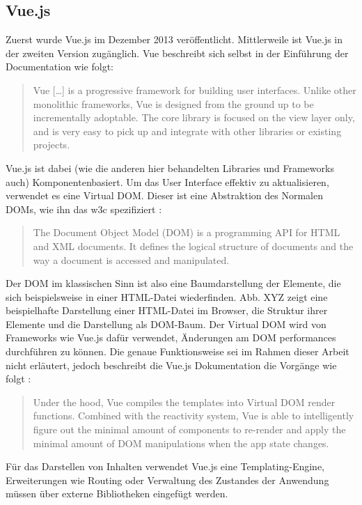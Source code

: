 \subsection{Vue.js}
Zuerst wurde Vue.js im Dezember 2013 veröffentlicht. Mittlerweile ist Vue.js in der zweiten Version zugänglich.
Vue beschreibt sich selbst in der Einführung der Documentation wie folgt:

\begin{quote}
  Vue […] is a progressive framework for building user interfaces. Unlike other monolithic frameworks, Vue is designed from the ground up to be incrementally adoptable. The core library is focused on the view layer only, and is very easy to pick up and integrate with other libraries or existing projects. \cite{VueIntro}
\end{quote}

Vue.js ist dabei (wie die anderen hier behandelten Libraries und Frameworks auch) Komponentenbasiert. Um das User Interface effektiv zu aktualisieren, verwendet es eine Virtual DOM. Dieser ist eine Abstraktion des Normalen DOMs, wie ihn das w3c spezifiziert \cite{w3cDOM}:

\begin{quote}
  The Document Object Model (DOM) is a programming API for HTML and XML documents. It defines the logical structure of documents and the way a document is accessed and manipulated.
\end{quote}

Der DOM im klassischen Sinn ist also eine Baumdarstellung der Elemente, die sich beispielsweise in einer HTML-Datei wiederfinden. Abb. XYZ zeigt eine beispielhafte Darstellung einer HTML-Datei im Browser, die Struktur ihrer Elemente und die Darstellung als DOM-Baum.
Der Virtual DOM wird von Frameworks wie Vue.js dafür verwendet, Änderungen am DOM performances durchführen zu können. Die genaue Funktionsweise sei im Rahmen dieser Arbeit nicht erläutert,  jedoch beschreibt die Vue.js Dokumentation die Vorgänge wie folgt \cite{VueTemplate}:

\begin{quote}
  Under the hood, Vue compiles the templates into Virtual DOM render functions. Combined with the reactivity system, Vue is able to intelligently figure out the minimal amount of components to re-render and apply the minimal amount of DOM manipulations when the app state changes.
\end{quote}

Für das Darstellen von Inhalten verwendet Vue.js eine Templating-Engine, Erweiterungen wie Routing oder Verwaltung des Zustandes der Anwendung müssen über externe Bibliotheken eingefügt werden.

